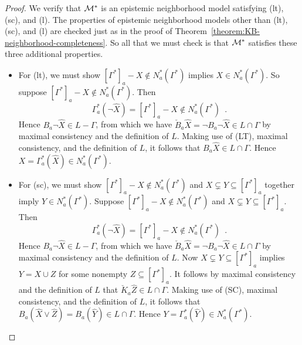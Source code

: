 \documentclass[12pt]{article}
\newcommand{\XXXcomment}[1]{}
\newcommand{\XXXcomment}[1]{\marginpar{\color{blue}{\footnotesize #1}}}
\theoremstyle{definition}
\newcommand{\M}{{\cal M}}      %
\begin{document}
\begin{proof}
  We verify that $\M^*$ is an epistemic neighborhood model satisfying
  (lt), (sc), and (l).  The properties of epistemic neighborhood
  models other than (lt), (sc), and (l) are checked just as in the
  proof of Theorem~\ref{theorem:KB-neighborhood-completeness}.  So all
  that we must check is that $\M^*$ satisfies these three additional
  properties.
  \begin{itemize}
  \item For (lt), we must show $[\Gamma^*]_a-X\notin N^*_a(\Gamma^*)$
    implies $X\in N^*_a(\Gamma^*)$. So suppose
    $[\Gamma^*]_a-X\notin N^*_a(\Gamma^*)$.  Then
    \[
    \Gamma^*_a(\lnot\hat X)=[\Gamma^*]_a-X\notin
    N^*_a(\Gamma^*)\enspace.
    \]
    Hence $B_a\lnot\hat X\in L-\Gamma$, from which we have $\check
    B_a\hat X=\lnot B_a\lnot\hat X\in L\cap\Gamma$ by maximal
    consistency and the definition of $L$.  Making use of (LT),
    maximal consistency, and the definition of $L$, it follows that
    $B_a\hat X\in L\cap\Gamma$.  Hence $X=\Gamma^*_a(\hat X)\in
    N^*_a(\Gamma^*)$.

  \item For (sc), we must show $[\Gamma^*]_a-X\notin N^*_a(\Gamma^*)$ and
    $X\subsetneq Y\subseteq[\Gamma^*]_a$ together imply $Y\in
    N^*_a(\Gamma^*)$.  Suppose $[\Gamma^*]_a-X\notin N^*_a(\Gamma^*)$ and
    $X\subsetneq Y\subseteq[\Gamma^*]_a$. Then
    \[
    \Gamma^*_a(\lnot\hat X)=[\Gamma^*]_a-X\notin
    N^*_a(\Gamma^*)\enspace.
    \]
    Hence $B_a\lnot\hat X\in L-\Gamma$, from which we have $\check
    B_a\hat X=\lnot B_a\lnot\hat X\in L\cap\Gamma$ by maximal
    consistency and the definition of $L$. Now $X\subsetneq
    Y\subseteq[\Gamma^*]_a$ implies $Y=X\cup Z$ for some nonempty
    $Z\subseteq[\Gamma^*]_a$.  It follows by maximal consistency and
    the definition of $L$ that $\check K_a\hat Z\in L\cap\Gamma$.
    Making use of (SC), maximal consistency, and the definition of
    $L$, it follows that $B_a(\hat X\lor\hat Z)=B_a(\hat Y)\in
    L\cap\Gamma$.  Hence $Y=\Gamma^*_a(\hat Y)\in N^*_a(\Gamma^*)$.

    \XXXcomment{The proof of property (l) needs to be checked
      carefully.\hfill--br}


\end{itemize}
\end{proof}
\end{document}
